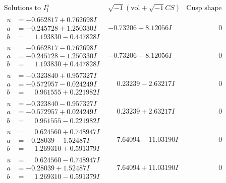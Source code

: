 \documentclass[1p]{elsarticle_modified}
\theoremstyle{definition}
\newcommand{\I}{\sqrt{-1}}
\begin{document}
$$\begin{array}{c|c|c}  
\text{Solutions to }I^u_{1}& \I (\text{vol} + \sqrt{-1}CS) & \text{Cusp shape}\\
 \hline 
\begin{aligned}
u &= -0.662817 + 0.762698 I \\
a &= -0.245728 + 1.250330 I \\
b &= \phantom{-}1.193830 - 0.447828 I\end{aligned}
 & -0.73206 + 8.12056 I & \phantom{-0.000000 } 0 \\ \hline\begin{aligned}
u &= -0.662817 - 0.762698 I \\
a &= -0.245728 - 1.250330 I \\
b &= \phantom{-}1.193830 + 0.447828 I\end{aligned}
 & -0.73206 - 8.12056 I & \phantom{-0.000000 } 0 \\ \hline\begin{aligned}
u &= -0.323840 + 0.957327 I \\
a &= -0.572957 - 0.024249 I \\
b &= \phantom{-}0.961555 + 0.221982 I\end{aligned}
 & \phantom{-}0.23239 - 2.63217 I & \phantom{-0.000000 } 0 \\ \hline\begin{aligned}
u &= -0.323840 - 0.957327 I \\
a &= -0.572957 + 0.024249 I \\
b &= \phantom{-}0.961555 - 0.221982 I\end{aligned}
 & \phantom{-}0.23239 + 2.63217 I & \phantom{-0.000000 } 0 \\ \hline\begin{aligned}
u &= \phantom{-}0.624560 + 0.748947 I \\
a &= -0.28039 - 1.52487 I \\
b &= \phantom{-}1.269310 + 0.591379 I\end{aligned}
 & \phantom{-}7.64094 - 11.03190 I & \phantom{-0.000000 } 0 \\ \hline\begin{aligned}
u &= \phantom{-}0.624560 - 0.748947 I \\
a &= -0.28039 + 1.52487 I \\
b &= \phantom{-}1.269310 - 0.591379 I\end{aligned}
 & \phantom{-}7.64094 + 11.03190 I & \phantom{-0.000000 } 0 \\ \hline\begin{aligned}

\end{aligned}
\end{array}$$
\end{document}
